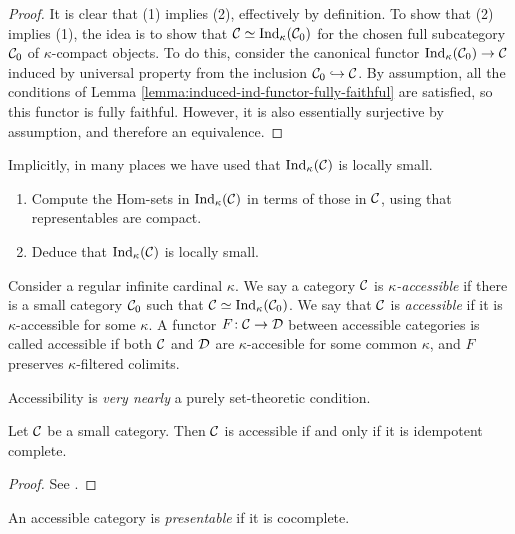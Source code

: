 \begin{proof}
It is clear that (1) implies (2), effectively by definition. To show that (2) implies (1), the idea is to show that \(\mathcal{C}\simeq\operatorname{Ind}_\kappa(\mathcal{C}_0)\) for the chosen full subcategory \(\mathcal{C}_0\) of \(\kappa\)-compact
objects. To do this, consider the canonical functor \(\operatorname{Ind}_\kappa(\mathcal{C}_0)\to\mathcal{C}\) induced by universal property from the inclusion \(\mathcal{C}_0\hookrightarrow\mathcal{C}\). By assumption, all the
conditions of Lemma \ref{lemma:induced-ind-functor-fully-faithful} are satisfied, so this functor is fully faithful. However, it is also essentially surjective by assumption, and therefore
an equivalence.
\end{proof}
\begin{exercise}
	Implicitly, in many places we have used that \(\operatorname{Ind}_\kappa(\mathcal{C})\) is locally small.
	\begin{enumerate}[label=(\arabic*)]
	\item Compute the Hom-sets in \(\operatorname{Ind}_\kappa(\mathcal{C})\) in terms of those in \(\mathcal{C}\), using that representables are compact.
	\item Deduce that \(\operatorname{Ind}_\kappa(\mathcal{C})\) is locally small.
	\end{enumerate}
\end{exercise}
\begin{definition}
	Consider a regular infinite cardinal \(\kappa\). We say a category \(\mathcal{C}\) is \(\kappa\)\emph{-accessible} if there is a small category \(\mathcal{C}_0\) such that \(\mathcal{C}\simeq\operatorname{Ind}_\kappa(\mathcal{C}_0)\).
	We say that \(\mathcal{C}\) is \emph{accessible} if it is \(\kappa\)-accessible for some \(\kappa\). A functor \(F\!:\mathcal{C}\to\mathcal{D}\) between accessible categories is called accessible
	if both \(\mathcal{C}\) and \(\mathcal{D}\) are \(\kappa\)-accesible for some common \(\kappa\), and \(F\) preserves \(\kappa\)-filtered colimits.
\end{definition}

Accessibility is \emph{very nearly} a purely set-theoretic condition.
\begin{proposition}
	Let \(\mathcal{C}\) be a small category. Then \(\mathcal{C}\) is accessible if and only if it is idempotent complete.
\end{proposition}
\begin{proof}
See \cite[Prop.\ 2.2.1 \& Thm.\ 2.2.2]{makkai-pare-accessible-categories}.
\end{proof}

\begin{definition}
	An accessible category is \emph{presentable} if it is cocomplete.
\end{definition}


